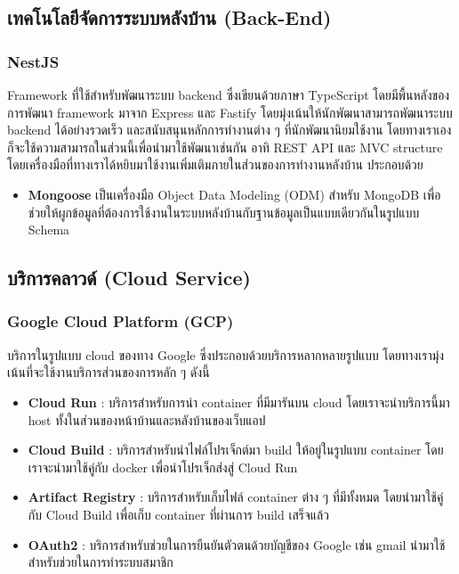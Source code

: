 \subsection{เทคโนโลยีจัดการระบบหลังบ้าน (Back-End)}
\subsubsection{NestJS}
Framework ที่ใช้สำหรับพัฒนาระบบ backend ซึ่งเขียนด้วยภาษา TypeScript
โดยมีพื้นหลังของการพัฒนา framework มาจาก Express และ Fastify
โดยมุ่งเน้นให้นักพัฒนาสามารถพัฒนาระบบ backend ได้อย่างรวดเร็ว
และสนับสนุนหลักการทำงานต่าง ๆ ที่นักพัฒนานิยมใช้งาน
โดยทางเราเองก็จะใช้ความสามารถในส่วนนี้เพื่อนำมาใช้พัฒนาเช่นกัน อาทิ REST API
และ MVC structure
โดยเครื่องมือที่ทางเราได้หยิบมาใช้งานเพิ่มเติมภายในส่วนของการทำงานหลังบ้าน ประกอบด้วย
\begin{itemize}
      \item \textbf{Mongoose} เป็นเครื่องมือ Object Data Modeling (ODM) สำหรับ MongoDB เพื่อช่วยให้ผูกข้อมูลที่ต้องการใช้งานในระบบหลังบ้านกับฐานข้อมูลเป็นแบบเดียวกันในรูปแบบ Schema
\end{itemize}

\subsection{บริการคลาวด์ (Cloud Service)}
\subsubsection{Google Cloud Platform (GCP)}
บริการในรูปแบบ cloud ของทาง Google ซึ่งประกอบด้วยบริการหลากหลายรูปแบบ
โดยทางเรามุ่งเน้นที่จะใช้งานบริการส่วนของการหลัก ๆ ดังนี้
\begin{itemize}
      \item \textbf{Cloud Run} : บริการสำหรับการนำ container ที่มีมารันบน cloud โดยเราจะนำบริการนี้มา host ทั้งในส่วนของหน้าบ้านและหลังบ้านของเว็บแอป
      \item \textbf{Cloud Build} : บริการสำหรับนำไฟล์โปรเจ็กต์มา build ให้อยู่ในรูปแบบ container โดยเราจะนำมาใช้คู่กับ docker เพื่อนำโปรเจ็กส่งสู่ Cloud Run
      \item \textbf{Artifact Registry} : บริการสำหรับเก็บไฟล์ container ต่าง ๆ ที่มีทั้งหมด โดยนำมาใช้คู่กับ Cloud Build เพื่อเก็บ container ที่ผ่านการ build เสร็จแล้ว
      \item \textbf{OAuth2} : บริการสำหรับช่วยในการยืนยันตัวตนด้วยบัญชีของ Google เช่น gmail นำมาใช้สำหรับช่วยในการทำระบบสมาชิก
\end{itemize}

